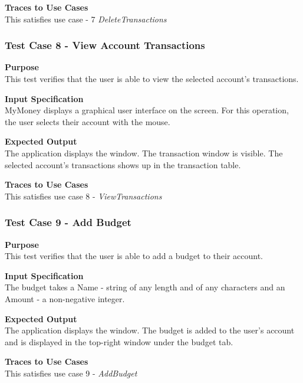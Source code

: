 \documentclass[12pt]{article}
\begin{document}
\noindent
{\bf Traces to Use Cases}\\
This satisfies use case  - 7 \textit{DeleteTransactions}

\subsubsection{Test Case 8 - View Account Transactions} \label{TC-8}
\noindent
{\bf Purpose}\\
This test verifies that the user is able to view the selected account's transactions.
                                                        
\noindent
{\bf Input Specification}\\
MyMoney displays a graphical user interface on the screen.
For this operation, the user selects their account with the mouse.

\noindent
{\bf Expected Output}\\
The application displays the window.       
The transaction window is visible.
The selected account's transactions shows up in the transaction table. 

\noindent
{\bf Traces to Use Cases}\\
This satisfies use case 8 - \textit{ViewTransactions}
\clearpage %


\subsubsection{Test Case 9 - Add Budget} \label{TC-9}
\noindent
{\bf Purpose}\\
This test verifies that the user is able to add a budget to their account.

{\bf Input Specification}\\
The budget takes a Name - string of any length and of any characters
and an Amount - a non-negative integer.

{\bf Expected Output}\\
The application displays the window.
The budget is added to the user's account and is displayed in the top-right window
under the budget tab.

\noindent
{\bf Traces to Use Cases}\\
This satisfies use case 9 - \textit{AddBudget}
\end{document}

